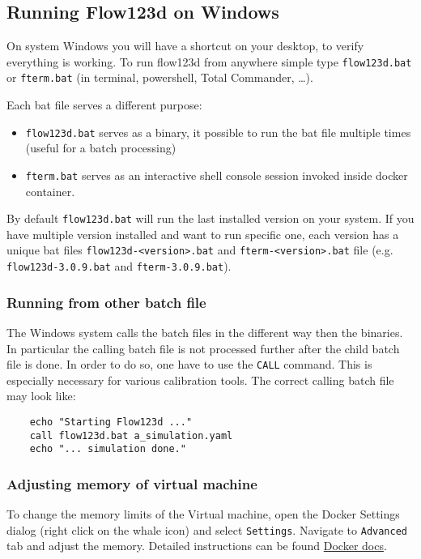 \subsection{Running Flow123d on Windows}
On system Windows you will have a shortcut on your desktop, to verify everything is working. To run flow123d from anywhere simple type
\verb'flow123d.bat' or \verb'fterm.bat' (in terminal, powershell, Total Commander, \dots).

Each bat file serves a different purpose:
\begin{itemize}
  \item \verb'flow123d.bat' serves as a binary, it possible to run the bat file multiple times (useful for a batch processing)
  \item \verb'fterm.bat' serves as an interactive shell console session invoked inside docker container.
\end{itemize}

By default \verb'flow123d.bat' will run the last installed version on your system. If you have multiple version installed and want to run specific one, each version has a unique bat files \verb'flow123d-<version>.bat' and \verb'fterm-<version>.bat' file (e.g. \verb'flow123d-3.0.9.bat' and \verb'fterm-3.0.9.bat').


\subsubsection{Running from other batch file}
The Windows system calls the batch files in the different way then the binaries. In particular the calling batch file is not processed further after the child batch
file is done. In order to do so, one have to use the \verb'CALL' command. This is especially necessary for various calibration tools. The correct calling batch file
may look like:
\begin{verbatim}
    echo "Starting Flow123d ..."
    call flow123d.bat a_simulation.yaml
    echo "... simulation done."
\end{verbatim}


\subsubsection{Adjusting memory of virtual machine}
To change the memory limits of the Virtual machine, open the Docker Settings dialog (right click on the whale icon) and select \verb'Settings'.
Navigate to \verb'Advanced' tab and adjust the memory. Detailed instructions can be found \href{https://docs.docker.com/docker-for-windows/#advanced}{Docker docs}.


